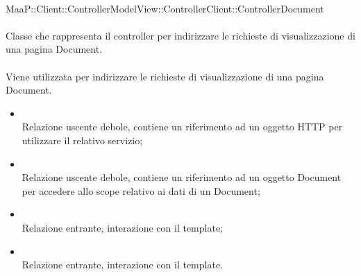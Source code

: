 	\\
	MaaP::Client::ControllerModelView::ControllerClient::ControllerDocument\\
	\\
	Classe che rappresenta il controller per indirizzare le richieste di visualizzazione di una pagina Document.\\
	\\
	Viene utilizzata per indirizzare le richieste di visualizzazione di una pagina Document.\\
	\begin{itemize}
	\item{}\\
	Relazione uscente debole, contiene un riferimento ad un oggetto HTTP per utilizzare il relativo servizio;
	\item{}\\
	Relazione uscente debole, contiene un riferimento ad un oggetto Document per accedere allo scope relativo ai dati di un Document;
	\item{}\\
	Relazione entrante, interazione con il template;
	\item{}\\
	Relazione entrante, interazione con il template.
	\end{itemize}
	
